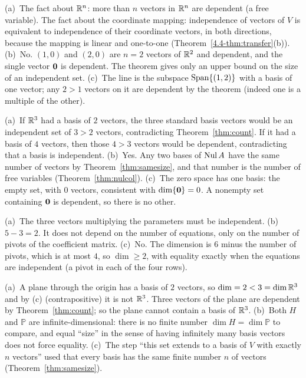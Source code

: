 \documentclass[11pt]{article}
\begin{document}
\begin{description}[leftmargin=0pt,itemsep=5pt]
  \item[Pause and think \ref{think:morethan}.] (a)~The fact about $\mathbb{R}^n$: more than $n$ vectors in $\mathbb{R}^n$ are dependent (a free variable). The fact about the coordinate mapping: independence of vectors of $V$ is equivalent to independence of their coordinate vectors, in both directions, because the mapping is linear and one-to-one (Theorem~\ref{4.4-thm:transfer}(b)). (b)~No. $(1,0)$ and $(2,0)$ are $n=2$ vectors of $\mathbb{R}^2$ and dependent, and the single vector $\mathbf{0}$ is dependent. The theorem gives only an upper bound on the size of an independent set. (c)~The line is the subspace $\operatorname{Span}\{(1,2)\}$ with a basis of one vector; any $2>1$ vectors on it are dependent by the theorem (indeed one is a multiple of the other).
  \item[Pause and think \ref{think:manybases}.] (a)~If $\mathbb{R}^3$ had a basis of $2$ vectors, the three standard basis vectors would be an independent set of $3>2$ vectors, contradicting Theorem~\ref{thm:count}. If it had a basis of $4$ vectors, then those $4>3$ vectors would be dependent, contradicting that a basis is independent. (b)~Yes. Any two bases of $\operatorname{Nul} A$ have the same number of vectors by Theorem~\ref{thm:samesize}, and that number is the number of free variables (Theorem~\ref{thm:nulcol}). (c)~The zero space has one basis: the empty set, with $0$ vectors, consistent with $\dim\{\mathbf{0}\}=0$. A nonempty set containing $\mathbf{0}$ is dependent, so there is no other.
  \item[Pause and think \ref{think:params}.] (a)~The three vectors multiplying the parameters must be independent. (b)~$5-3=2$. It does not depend on the number of equations, only on the number of pivots of the coefficient matrix. (c)~No. The dimension is $6$ minus the number of pivots, which is at most $4$, so $\dim\ge2$, with equality exactly when the equations are independent (a pivot in each of the four rows).
  \item[Pause and think \ref{think:equal}.] (a)~A plane through the origin has a basis of $2$ vectors, so $\dim=2<3=\dim\mathbb{R}^3$ and by (c) (contrapositive) it is not $\mathbb{R}^3$. Three vectors of the plane are dependent by Theorem~\ref{thm:count}; so the plane cannot contain a basis of $\mathbb{R}^3$. (b)~Both $H$ and $\mathbb{P}$ are infinite-dimensional: there is no finite number $\dim H=\dim\mathbb{P}$ to compare, and equal ``size'' in the sense of having infinitely many basis vectors does not force equality. (c)~The step ``this set extends to a basis of $V$ with exactly $n$ vectors'' used that every basis has the same finite number $n$ of vectors (Theorem~\ref{thm:samesize}).

\end{description}
\end{document}
